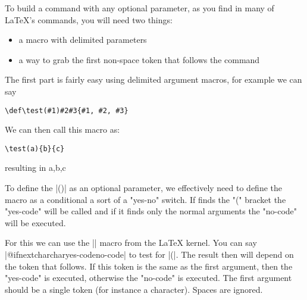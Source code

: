 \begin{teX}


\end{teX}

\begin{teX}
\def \xxWithOpt [#1] #2{...}
\def\xxNoOpt #2{...}

\def\xx {%
\futurelet\xxLookedAtToken
    \xxDecide
}

\def\xxDecide {%
 \ifx\xxLookedAtToken [%
\let\next = \xxWithOpt
\else
 \let\next = \xxNoOpt
 \fi
\next
}
\end{teX}



To build a command with any optional parameter, as you find in many of LaTeX's commands, you will need two things:

\begin{itemize}
\item a macro with delimited parameters

\item a way to grab the first non-space token that follows the command
\end{itemize}


The first part is fairly easy using delimited argument macros, for example we can say

\begin{verbatim}
\def\test(#1)#2#3{#1, #2, #3}
\end{verbatim}

We can then call this macro as:

\begin{verbatim}
\test(a){b}{c}
\end{verbatim}


resulting in a,b,c

To define the |()| as an optional parameter, we effectively need to define the macro as a conditional a sort of a "yes-no" switch. If \tex finds the "(" bracket the "yes-code" will be called and if it finds only the normal arguments the "no-code" will be executed.

For this we can use the |\@ifnextchar| macro from the LaTeX kernel.
You can say |@ifnextchar{char}{yes-code}{no-code}| to test for |(|. The result then will depend on the token that follows. If this token is the same as the first argument, then the "yes-code" is executed, otherwise the "no-code" is executed. The first argument should be a single token (for instance a character). Spaces are ignored. 

